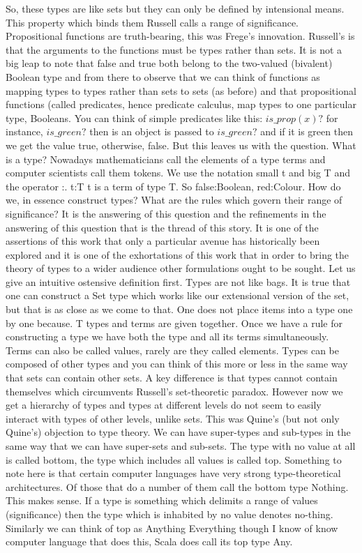 \documentclass[dah,phd,a4paper]{xe_uccthesis}
\begin{document}
So, these types are like sets but they can only be defined by intensional means. This property which binds them Russell calls a range of significance. Propositional functions are truth-bearing, this was Frege's innovation. Russell's is that the arguments to the functions must be types rather than sets. It is not a big leap to note that false and true both belong to the two-valued (bivalent) Boolean type and from there to observe that we can think of functions as mapping types to types rather than sets to sets (as before) and that propositional functions (called predicates, hence predicate calculus, map types to one particular type, Booleans. You can think of simple predicates like this: $is\_prop(x)?$ for instance, $is\_green?$ then is an object is passed to $is\_green?$ and if it is green then we get the value true, otherwise, false.
	But this leaves us with the question. What is a type? Nowadays mathematicians call the elements of a type terms and computer scientists call them tokens. We use the notation small t and big T and the operator :. t:T t is a term of type T. So false:Boolean, red:Colour. How do we, in essence construct types? What are the rules which govern their range of significance? It is the answering of this question and the refinements in the answering of this question that is the thread of this story. It is one of the assertions of this work that only a particular avenue has historically been explored and it is one of the exhortations of this work that in order to bring the theory of types to a wider audience other formulations ought to be sought.
	Let us give an intuitive ostensive definition first. Types are not like bags. It is true that one can construct a Set type which works like our extensional version of the set, but that is as close as we come to that. One does not place items into a type one by one because. T types and terms are given together. Once we have a rule for constructing a type we have both the type and all its terms simultaneously. Terms can also be called values, rarely are they called elements. Types can be composed of other types and you can think of this more or less in the same way that sets can contain other sets. A key difference is that types cannot contain themselves which circumvents Russell's set-theoretic paradox. However now we get a hierarchy of types and types at different levels do not seem to easily interact with types of other levels, unlike sets. This was Quine's (but not only Quine's) objection to type theory.
We can have super-types and sub-types in the same way that we can have super-sets and sub-sets.
The type with no value at all is called bottom, the type which includes all values is called top. Something to note here is that certain computer languages have very strong type-theoretical architectures. Of those that do a number of them call the bottom type Nothing. This makes sense. If a type is something which delimits a range of values (significance) then the type which is inhabited by no value denotes no-thing. Similarly we can think of top as Anything Everything though I know of know computer language that does this, Scala does call its top type Any.
\end{document}
